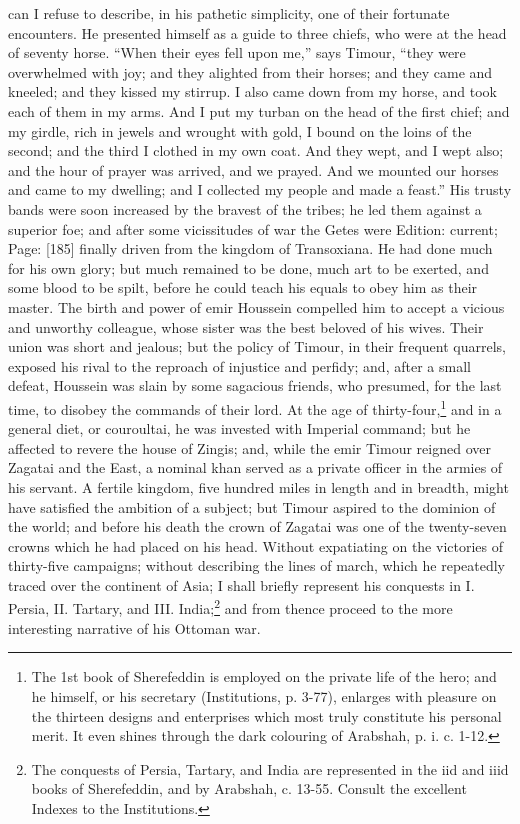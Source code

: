 can I refuse to describe, in his pathetic simplicity, one of their fortunate encounters. He presented himself as a guide to three chiefs, who were at the head of seventy horse. \texthebrew{“}When their eyes fell upon me,\texthebrew{}” says Timour, \texthebrew{“}they were overwhelmed with joy; and they alighted from their horses; and they came and kneeled; and they kissed my stirrup. I also came down from my horse, and took each of them in my arms. And I put my turban on the head of the first chief; and my girdle, rich in jewels and wrought with gold, I bound on the loins of the second; and the third I clothed in my own coat. And they wept, and I wept also; and the hour of prayer was arrived, and we prayed. And we mounted our horses and came to my dwelling; and I collected my people and made a feast.\texthebrew{}” His trusty bands were soon increased by the bravest of the tribes; he led them against a superior foe; and after some vicissitudes of war the Getes were Edition: current; Page: [185] finally driven from the kingdom of Transoxiana. He had done much for his own glory; but much remained to be done, much art to be exerted, and some blood to be spilt, before he could teach his equals to obey him as their master. The birth and power of emir Houssein compelled him to accept a vicious and unworthy colleague, whose sister was the best beloved of his wives. Their union was short and jealous; but the policy of Timour, in their frequent quarrels, exposed his rival to the reproach of injustice and perfidy; and, after a small defeat, Houssein was slain by some sagacious friends, who presumed, for the last time, to disobey the commands of their lord. At the age of thirty-four,\footnote{The 1st book of Sherefeddin is employed on the private life of the hero; and he himself, or his secretary (Institutions, p. 3-77), enlarges with pleasure on the thirteen designs and enterprises which most truly constitute his personal merit. It even shines through the dark colouring of Arabshah, p. i. c. 1-12.} and in a general diet, or couroultai, he was invested with Imperial command; but he affected to revere the house of Zingis; and, while the emir Timour reigned over Zagatai and the East, a nominal khan served as a private officer in the armies of his servant. A fertile kingdom, five hundred miles in length and in breadth, might have satisfied the ambition of a subject; but Timour aspired to the dominion of the world; and before his death the crown of Zagatai was one of the twenty-seven crowns which he had placed on his head. Without expatiating on the victories of thirty-five campaigns; without describing the lines of march, which he repeatedly traced over the continent of Asia; I shall briefly represent his conquests in I. Persia, II. Tartary, and III. India;\footnote{The conquests of Persia, Tartary, and India are represented in the iid and iiid books of Sherefeddin, and by Arabshah, c. 13-55. Consult the excellent Indexes to the Institutions.} and from thence proceed to the more interesting narrative of his Ottoman war.

